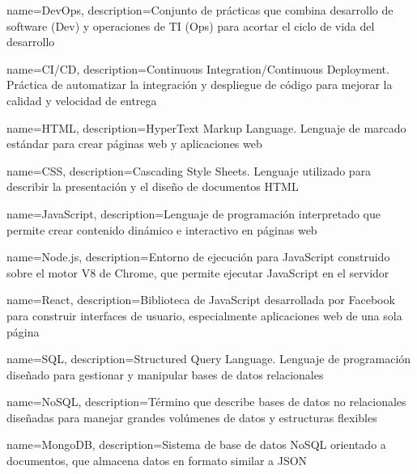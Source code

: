 {
    name={DevOps},
    description={Conjunto de prácticas que combina desarrollo de software (Dev) y operaciones de TI (Ops) para acortar el ciclo de vida del desarrollo}
}

{
    name={CI/CD},
    description={Continuous Integration/Continuous Deployment. Práctica de automatizar la integración y despliegue de código para mejorar la calidad y velocidad de entrega}
}


{
    name={HTML},
    description={HyperText Markup Language. Lenguaje de marcado estándar para crear páginas web y aplicaciones web}
}

{
    name={CSS},
    description={Cascading Style Sheets. Lenguaje utilizado para describir la presentación y el diseño de documentos HTML}
}

{
    name={JavaScript},
    description={Lenguaje de programación interpretado que permite crear contenido dinámico e interactivo en páginas web}
}

{
    name={Node.js},
    description={Entorno de ejecución para JavaScript construido sobre el motor V8 de Chrome, que permite ejecutar JavaScript en el servidor}
}

{
    name={React},
    description={Biblioteca de JavaScript desarrollada por Facebook para construir interfaces de usuario, especialmente aplicaciones web de una sola página}
}


{
    name={SQL},
    description={Structured Query Language. Lenguaje de programación diseñado para gestionar y manipular bases de datos relacionales}
}

{
    name={NoSQL},
    description={Término que describe bases de datos no relacionales diseñadas para manejar grandes volúmenes de datos y estructuras flexibles}
}

{
    name={MongoDB},
    description={Sistema de base de datos NoSQL orientado a documentos, que almacena datos en formato similar a JSON}
}

